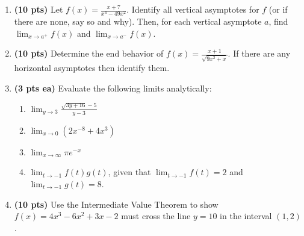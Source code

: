 \documentclass[12pt]{article}
\begin{document}
\begin{enumerate}

\newpage
\item {\bf (10 pts)} Let $f(x)=\frac{x+7}{x^4-49x^2}$.  Identify all vertical asymptotes for $f$ (or if there are none, say so and why).  Then, for each vertical asymptote $a$, find $\lim_{x\to a^+}f(x)$ and $\lim_{x\to a^-}f(x)$.	

\newpage
\item {\bf (10 pts)} Determine the end behavior of $f(x)=\frac{x+1}{\sqrt{9x^2+x}}$.  If there are any horizontal asymptotes then identify them.

\newpage
\item {\bf (3 pts ea)} Evaluate the following limits analytically:
\begin{enumerate}
	\item $\lim_{y\to 3}\frac{\sqrt{3y+16}-5}{y-3}$
	\vspace{22pc}
	
	\item $\lim_{x\to 0}(2x^{-8}+4x^3)$
	\newpage
	\item $\lim_{x\to \infty}\pi e^{-x}$
	\vspace{22pc}
	
	\item $\lim_{t\to -1}f(t)g(t)$, given that $\lim_{t\to -1}f(t)=2$ and $\lim_{t\to -1}g(t)=8$.
\end{enumerate}

\newpage
\item {\bf (10 pts)} 
Use the Intermediate Value Theorem to show $f(x)=4x^3-6x^2+3x-2$ must cross the line $y=10$ in the interval $(1,2)$.


\end{enumerate}
\end{document}
